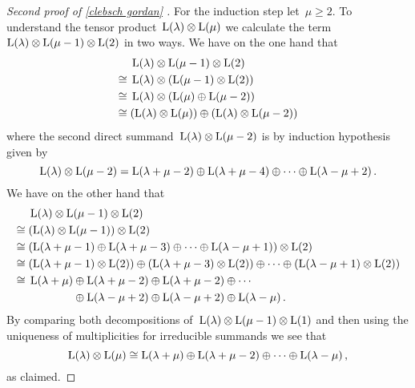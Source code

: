 \begin{proof}[Second proof of \cref{clebsch gordan} {\cite[\S 1.4]{lectures_on_sl2_modules}}]
  For the induction step let~$\mu \geq 2$.
  To understand the tensor product~$\operatorname{L}(\lambda) \otimes \operatorname{L}(\mu)$ we calculate the term~$\operatorname{L}(\lambda) \otimes \operatorname{L}(\mu-1) \otimes \operatorname{L}(2)$ in two ways.
  We have on the one hand that
  \begin{align*}
    {}&
    \operatorname{L}(\lambda) \otimes \operatorname{L}(\mu-1) \otimes \operatorname{L}(2)
    \\
    \cong{}&
    \operatorname{L}(\lambda) \otimes ( \operatorname{L}(\mu-1) \otimes \operatorname{L}(2) )
    \\
    \cong{}&
    \operatorname{L}(\lambda) \otimes ( \operatorname{L}(\mu) \oplus \operatorname{L}(\mu-2) )
    \\
    \cong{}&
    ( \operatorname{L}(\lambda) \otimes \operatorname{L}(\mu) )
    \oplus
    ( \operatorname{L}(\lambda) \otimes \operatorname{L}(\mu-2) )
  \end{align*}
  where the second direct summand~$\operatorname{L}(\lambda) \otimes \operatorname{L}(\mu-2)$ is by induction hypothesis given by
  \[
    \operatorname{L}(\lambda) \otimes \operatorname{L}(\mu-2)
    =
            \operatorname{L}(\lambda+\mu-2)
    \oplus  \operatorname{L}(\lambda+\mu-4)
    \oplus  \dotsb
    \oplus  \operatorname{L}(\lambda-\mu+2) \,.
  \]
  We have on the other hand that
  \begin{align*}
    {}&
    \irr(\lambda) \tensor \irr(\mu-1) \tensor \irr(2)
    \\
    \cong{}&
    ( \irr(\lambda) \tensor \irr(\mu-1) ) \tensor \irr(2)
    \\
    \cong{}&
    (
              \irr(\lambda+\mu-1)
      \oplus  \irr(\lambda+\mu-3)
      \oplus  \dotsb
      \oplus  \irr(\lambda-\mu+1)
    )
    \tensor
    \irr(2)
    \\
    \cong{}&
            ( \irr(\lambda+\mu-1) \tensor \irr(2) )
    \oplus  ( \irr(\lambda+\mu-3) \tensor \irr(2) )
    \oplus  \dotsb
    \oplus  ( \irr(\lambda-\mu+1) \tensor \irr(2) )
    \\
    \cong{}&
            \irr(\lambda+\mu)   \oplus \irr(\lambda+\mu-2)
    \oplus  \irr(\lambda+\mu-2) \oplus \dotsb
    \\
    {}& 
            \phantom{\irr(\lambda+\mu)} \,
    \oplus  \irr(\lambda-\mu+2)
    \oplus  \irr(\lambda-\mu+2) \oplus \irr(\lambda-\mu)  \,.
  \end{align*}
  By comparing both decompositions of~$\operatorname{L}(\lambda) \otimes \operatorname{L}(\mu-1) \otimes \operatorname{L}(1)$ and then using the uniqueness of multiplicities for irreducible summands we see that
  \[
    \operatorname{L}(\lambda) \otimes \operatorname{L}(\mu)
    \cong
            \operatorname{L}(\lambda+\mu)
    \oplus  \operatorname{L}(\lambda+\mu-2)
    \oplus  \dotsb
    \oplus  \operatorname{L}(\lambda-\mu) \,,
  \]
  as claimed.
\end{proof}



